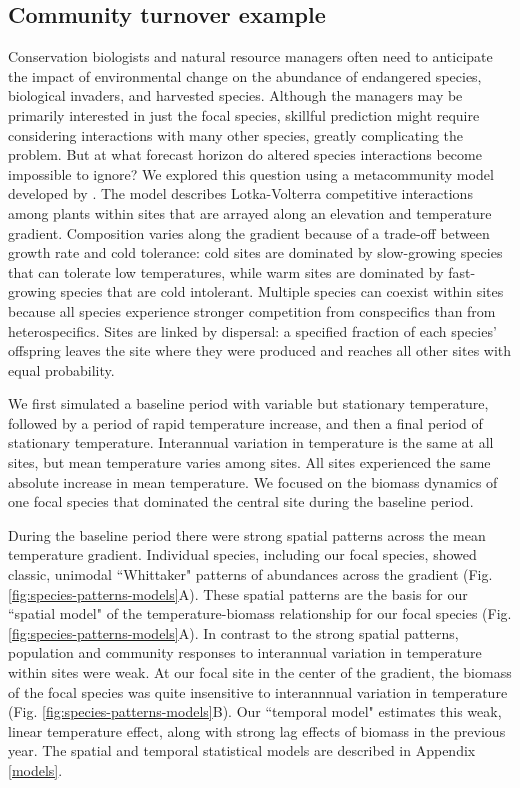 \documentclass[11pt]{article}
\begin{document}
\subsection*{Community turnover example}

Conservation biologists and natural resource managers often need to anticipate the impact of environmental change on the abundance of 
endangered species, biological invaders, and harvested species. Although the managers may be primarily interested in just the focal species, skillful prediction might require considering interactions with many other species, greatly complicating the problem. But at what forecast horizon do altered species interactions become impossible to ignore? We explored this question using a metacommunity model developed by \cite{alexander_lags_2018}. The model describes Lotka-Volterra competitive interactions among plants within sites that are arrayed along an elevation and temperature gradient. Composition varies along the gradient because of a trade-off between growth rate and cold tolerance: cold sites are dominated by slow-growing species that can tolerate low temperatures, while warm sites are dominated by  fast-growing species that are cold intolerant. Multiple species can coexist within sites because all species experience stronger competition from conspecifics than from heterospecifics. Sites are linked by dispersal: a specified fraction of each species' offspring leaves the site where they were produced and reaches all other sites with equal probability.

We first simulated a baseline period with variable but stationary temperature, followed by a period of rapid temperature increase, and then a final period of stationary temperature. Interannual variation in temperature is the same at all sites, but mean temperature varies among sites. All sites experienced the same absolute increase in mean temperature. We focused on the biomass dynamics of one focal species that dominated the central site during the baseline period.

During the baseline period there were strong spatial patterns across the mean temperature gradient. 
Individual species, including our focal species, showed classic, unimodal ``Whittaker" patterns of abundances across the gradient (Fig. \ref{fig:species-patterns-models}A).
These spatial patterns are the basis for our ``spatial model" of the temperature-biomass relationship for our focal species (Fig. \ref{fig:species-patterns-models}A). 
In contrast to the strong spatial patterns, population and community responses to interannual variation in temperature within sites were weak.
At our focal site in the center of the gradient, the biomass of the focal species was quite insensitive to interannnual variation in temperature (Fig. \ref{fig:species-patterns-models}B). Our ``temporal model" estimates this weak, linear temperature effect, along with strong lag effects of biomass in the previous year. The spatial and temporal statistical
models are described in Appendix \ref{models}.
\end{document}
